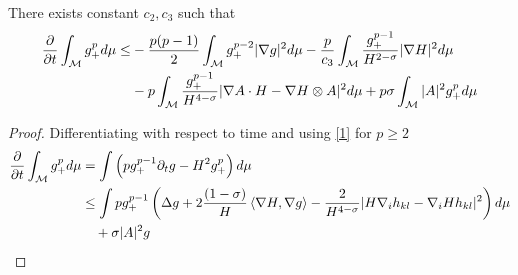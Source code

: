 \begin{lemma}
   There exists constant $ c_{2} , c_{3}$ such that 
    \begin{align*}
        \frac{\partial}{\partial t} \int_{ \mathcal{M}} g_{+}^{p} d \mu \le& - \frac{p(p-1)}{2} \int_{ \mathcal{M}} g_{+}^{p-2}| \nabla g|^{2}d \mu - \frac{p}{c_{3}} \int_{ \mathcal{M}} \frac{g_{+}^{p-1}}{H^{2 -\sigma}}|\nabla H|^{2} d \mu \\
        & - p \int_{ \mathcal{M}} \frac{g_{+}^{p-1}}{H^{4-\sigma}}| \nabla A \cdot H - \nabla H \otimes A|^{2} d \mu + p \sigma \int_{ \mathcal{ M}}|A|^{2} g_{+}^{p} d \mu 
    \end{align*}
   
\end{lemma}

\begin{proof}
    Differentiating with respect to time and using \cref{1} for $ p \ge 2 $
    \begin{align}
        \frac{\partial}{\partial t} \int_{ \mathcal{M}} g_{+}^{p} d \mu  & =  \int \left(pg_{+}^{p-1} \partial_{t}g - H^{2}g_{+}^{p}\right) d \mu \nonumber \\
        & \le \int pg_{+}^{p-1}\left( \Delta g + 2\frac{(1-\sigma)}{H}\left< \nabla H, \nabla g\right>  - \frac{2}{H^{4-\sigma}}|H \nabla_{i}h_{kl} - \nabla_{i}Hh_{kl}|^{2}\right)d \mu  \nonumber\\
        & \quad + \sigma |A|^{2} g \label{Lpg}
    \end{align}


\end{proof}
